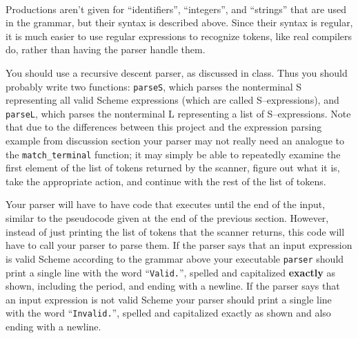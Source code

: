 \documentclass[11pt]{article}
\begin{document}
    \begin{center}

      \begin{grammar}

          \\

          \\

          \\

          \\

          \\

          \\

      \end{grammar}

    \end{center}

    \vspace{-1.5mm}

    Productions aren't given for ``identifiers'', ``integers'', and
  ``strings'' that are used in the grammar, but their syntax is described
  above.  Since their syntax is regular, it is much easier to use regular
  expressions to recognize tokens, like real compilers do, rather than
  having the parser handle them.

    You should use a recursive descent parser, as discussed in class.  Thus
  you should probably write two functions: \texttt{parseS}, which parses the
  nonterminal S representing all valid Scheme expressions (which are called
  S--expressions), and \texttt{parseL}, which parses the nonterminal L
  representing a list of S--expressions.  Note that due to the differences
  between this project and the expression parsing example from discussion
  section your parser may not really need an analogue to the
  \texttt{match\_terminal} function; it may simply be able to repeatedly
  examine the first element of the list of tokens returned by the scanner,
  figure out what it is, take the appropriate action, and continue with the
  rest of the list of tokens.

    Your parser will have to have code that executes until the end of the
  input, similar to the pseudocode given at the end of the previous section.
  However, instead of just printing the list of tokens that the scanner
  returns, this code will have to call your parser to parse them.  If the
  parser says that an input expression is valid Scheme according to the
  grammar above your executable \texttt{parser} should print a single line
  with the word ``\texttt{Valid.}'', spelled and capitalized
  \textbf{exactly} as shown, including the period, and ending with a
  newline.  If the parser says that an input expression is not valid Scheme
  your parser should print a single line with the word ``\texttt{Invalid.}'',
  spelled and capitalized exactly as shown and also ending with a newline.
\end{document}
